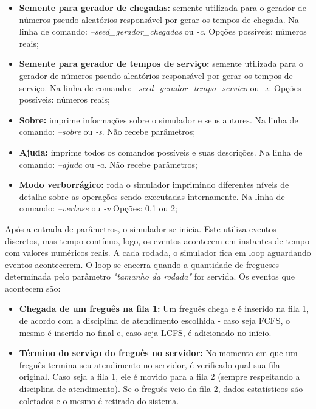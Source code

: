 \documentclass[a4paper,10pt]{article}
\begin{document}
\begin {itemize}
\item \textbf{Semente para gerador de chegadas:} semente utilizada para o gerador de números pseudo-aleatórios responsável por gerar os tempos de chegada. Na linha de comando: \emph{--seed\_gerador\_chegadas} ou \emph{-c}. Opções possíveis: números reais;

\item \textbf{Semente para gerador de tempos de serviço:} semente utilizada para o gerador de números pseudo-aleatórios responsável por gerar os tempos de serviço. Na linha de comando: \emph{--seed\_gerador\_tempo\_servico} ou \emph{-x}. Opções possíveis: números reais;

\item \textbf{Sobre:} imprime informações sobre o simulador e seus autores. Na linha de comando: \emph{--sobre} ou \emph{-s}. Não recebe parâmetros;

\item \textbf{Ajuda:} imprime todos os comandos possíveis e suas descrições. Na linha de comando: \emph{--ajuda} ou \emph{-a}. Não recebe parâmetros;

\item \textbf{Modo verborrágico:} roda o simulador imprimindo diferentes níveis de detalhe sobre as operações sendo executadas internamente. Na linha de comando: \emph{--verbose} ou \emph{-v} Opções: 0,1 ou 2;
\end {itemize}

    Após a entrada de parâmetros, o simulador se inicia. Este utiliza eventos discretos, mas tempo contínuo, logo, os eventos acontecem em instantes de tempo com valores numéricos reais. A cada rodada, o simulador fica em loop aguardando eventos acontecerem. O loop se encerra quando a quantidade de fregueses determinada pelo parâmetro \emph{"tamanho da rodada"} for servida. Os eventos que acontecem são:

\begin {itemize}
\item \textbf{Chegada de um freguês na fila 1:} Um freguês chega e é inserido na fila 1, de acordo com a disciplina de atendimento escolhida - caso seja FCFS, o mesmo é inserido no final e, caso seja LCFS, é adicionado no início.

\item \textbf{Término do serviço do freguês no servidor:} No momento em que um freguês termina seu atendimento no servidor, é verificado qual sua fila original. Caso seja a fila 1,
ele é movido para a fila 2 (sempre respeitando a disciplina de atendimento). Se o freguês veio da fila 2, dados estatísticos são coletados e o mesmo é retirado do sistema.
\end {itemize}
\end{document}
